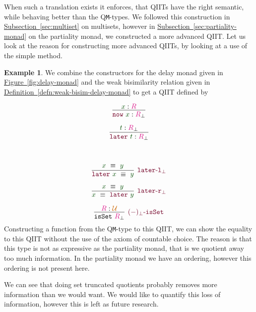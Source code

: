 \documentclass[twoside,11pt,openright]{report}
\theoremstyle{plain} %
\theoremstyle{definition}
\newtheorem{exmp}{Example} %
\theoremstyle{remark}
\newcommand*{\defref}[1]{\hyperref[defn:#1]{Definition~\ref*{defn:#1}}}
\newcommand*{\figref}[1]{\hyperref[fig:#1]{Figure~\ref*{fig:#1}}}
\newcommand*{\subsectionref}[1]{\hyperref[sec:#1]{Subsection~\ref*{sec:#1}}}
\newcommand*{\term}[1]{\textcolor{green!30!black}{#1}} %
\newcommand*{\type}[1]{\textcolor{magenta!90!black}{#1}}
\newcommand*{\universe}[1]{\textcolor{orange!80!black}{#1}}
\newcommand*{\constructor}[1]{\textcolor{purple!60!black}{\ensuremath{\mathtt{#1}}}}
\begin{document}
When such a translation exists it enforces, that QIITs have the right semantic, while behaving better than the Q\texttt{M}-types. We followed this construction in \subsectionref{multiset} on multisets, however in \subsectionref{partiality-monad} on the partiality monad, we constructed a more advanced QIIT. Let us look at the reason for constructing more advanced QIITs, by looking at a use of the simple method.
\begin{exmp}
  We combine the constructors for the delay monad given in \figref{delay-monad} and the weak bisimilarity relation given in \defref{weak-bisim-delay-monad} to get a QIIT defined by
  \begin{center}
    \strut
    \hfill
    \begin{minipage}[h]{0.35\linewidth}
      \begin{equation}
        \vcenter{\infer{\constructor{now}~\term{x} : \type{R}_{\bot}}{\term{x} : \type{R}}}
      \end{equation}
    \end{minipage}
    \hfill
    \begin{minipage}[h]{0.35\linewidth}
      \begin{equation}
        \vcenter{\infer{\constructor{later}~\term{t} : \type{R}_{\bot}}{\term{t} : \type{R}_{\bot}}}
      \end{equation}
    \end{minipage}
    \hfill
    \strut
    \\
    \strut
    \hfill
    \begin{minipage}[h]{0.35\linewidth}
      \begin{equation}
        \vcenter{\infer[\constructor{later\text{-}l_{\bot}}]{\constructor{later}~\term{x}~\equiv~\term{y}}{\term{x}~\equiv~\term{y}}}
      \end{equation}
    \end{minipage}
    \hfill
    \begin{minipage}[h]{0.35\linewidth}
      \begin{equation}
        \vcenter{\infer[\constructor{later\text{-}r_{\bot}}]{\term{x}~\equiv~\constructor{later}~\term{y}}{\term{x}~\equiv~\term{y}}}
      \end{equation}
    \end{minipage}
    \hfill
    \strut
  \end{center}
  \begin{equation}
    \vcenter{\infer[\constructor{(-)_{\bot}\text{-}isSet}]{\mathtt{isSet}~\type{R}_{\bot}}{\type{R} : \universe{\mathcal{U}}}}
  \end{equation}
  Constructing a function from the Q\texttt{M}-type to this QIIT, we can show the equality to this QIIT without the use of the axiom of countable choice. The reason is that this type is not as expressive as the partiality monad, that is we quotient away too much information. In the partiality monad we have an ordering, however this ordering is not present here. 
\end{exmp}
\noindent We can see that doing set truncated quotients probably removes more information than we would want. We would like to quantify this loss of information, however this is left as future research.
\end{document}
